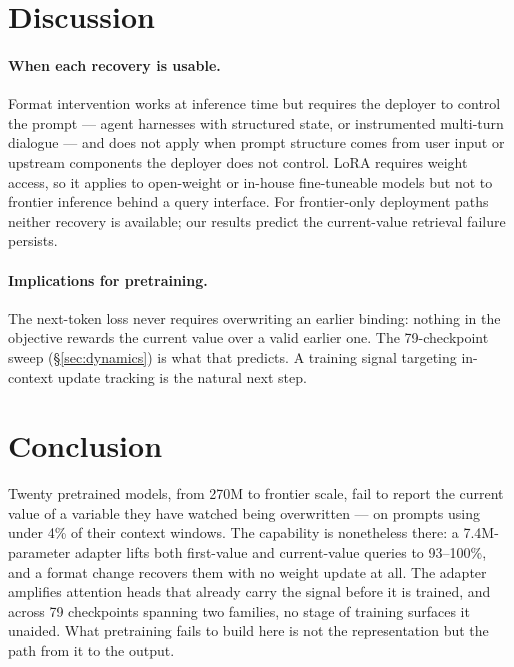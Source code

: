\documentclass[letterpaper]{article} %
\begin{document}
\section{Discussion}
\label{sec:discussion}

\paragraph{When each recovery is usable.}
Format intervention works at inference time but requires the
deployer to control the prompt --- agent harnesses with structured
state, or instrumented multi-turn dialogue --- and does not apply
when prompt structure comes from user input or upstream components
the deployer does not control.
LoRA requires weight access, so it applies to open-weight or
in-house fine-tuneable models but not to frontier inference behind
a query interface.
For frontier-only deployment paths neither recovery is available;
our results predict the current-value retrieval failure persists.

\paragraph{Implications for pretraining.}
The next-token loss never requires overwriting an earlier binding:
nothing in the objective rewards the current value over a valid
earlier one. The 79-checkpoint sweep (\S\ref{sec:dynamics}) is what
that predicts. A training signal targeting in-context update
tracking is the natural next step.

\section{Conclusion}

Twenty pretrained models, from 270M to frontier scale, fail to
report the current value of a variable they have watched being
overwritten --- on prompts using under 4\% of their context
windows. The capability is nonetheless there: a 7.4M-parameter
adapter lifts both first-value and current-value queries to
93--100\%, and a format change recovers them with no weight update
at all. The adapter amplifies attention heads that already carry
the signal before it is trained, and across 79 checkpoints spanning
two families, no stage of training surfaces it unaided. What
pretraining fails to build here is not the representation but the
path from it to the output.



\end{document}
